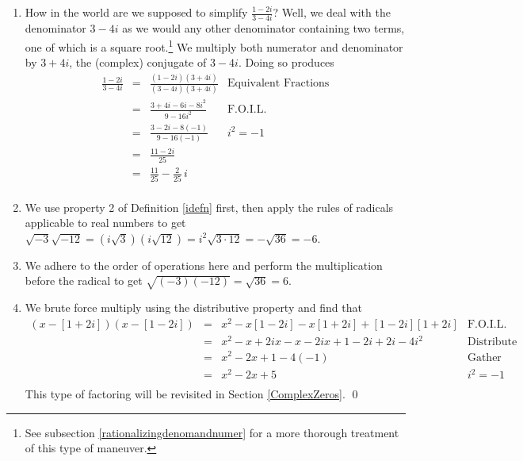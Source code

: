 \documentclass{ximera}
\begin{document}
\begin{example}
\begin{explanation}
\begin{enumerate}
\item  How in the world are we supposed to simplify $\frac{1-2i}{3-4i}$?  Well, we deal with the denominator $3-4i$ as we would any other denominator containing two terms, one of which is a square root.\footnote{See subsection \ref{rationalizingdenomandnumer} for a more thorough treatment of this type of maneuver.} We multiply both numerator and denominator by $3+4i$, the (complex) conjugate of $3 - 4i$.  Doing so produces\[\begin{array}{rclr}

 \frac{1-2i}{3-4i} & = & \frac{(1-2i)(3+4i)}{(3-4i)(3+4i)} & \text{Equivalent Fractions} \\ 

& = &   \frac{3 + 4i - 6i - 8i^2}{9 - 16i^2} & \text{F.O.I.L.}\\ 
& = & \frac{3 - 2i - 8(-1)}{9  - 16(-1)} & \text{$i^2 = -1$}\\ 
& = &  \frac{11 - 2i}{25} & \\ 
& = & \frac{11}{25} - \frac{2}{25} \, i & \\ \end{array}\]
										

\item  We use property 2 of Definition \ref{idefn} first, then apply the rules of radicals applicable to real numbers to get $\sqrt{-3} \sqrt{-12} = \left(i \sqrt{3}\right) \left(i \sqrt{12}\right) = i^2 \sqrt{3\cdot 12} = -\sqrt{36} = -6$.

\item  We adhere to the order of operations here and perform the multiplication before the radical to get  $\sqrt{(-3)(-12)} = \sqrt{36} = 6$. 

\item  We brute force multiply using the distributive property and find that \[\begin{array}{rclr} (x-[1+2i])(x-[1-2i]) & = &  x^2 -x[1-2i]-x[1+2i]+[1-2i][1+2i] & \text{F.O.I.L.}\\ 
 &	= & x^2-x+2ix-x-2ix+1-2i+2i-4i^2 & \text{Distribute} \\  
 &	= & x^2-2x + 1-4(-1)& \text{Gather like terms}\\ 
	 & =  & x^2 -2x +5 & i^2=-1 \\ \end{array}\] This type of factoring will be revisited in Section \ref{ComplexZeros}. \qed

\end{enumerate}
\end{explanation}
\end{example}
\end{document}
